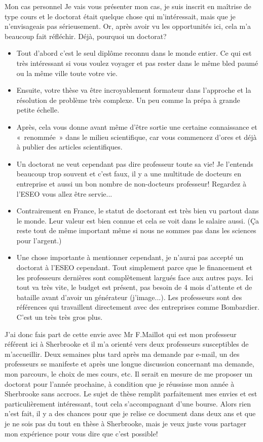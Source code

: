 \begin{example}{Mon cas personnel}
  Je vais vous présenter mon cas, je suis inscrit en maîtrise de type cours et le doctorat était quelque chose qui m’intéressait, mais que je n’envisageais pas sérieusement. Or, après avoir vu les opportunités ici, cela m’a beaucoup fait réfléchir.
  Déjà, pourquoi un doctorat?
  \begin{itemize}
    \item Tout d’abord c’est le seul diplôme reconnu dans le monde entier. Ce qui est très intéressant si vous voulez voyager et pas rester dans le même bled paumé ou la même ville toute votre vie.
    \item Ensuite, votre thèse va être incroyablement formateur dans l’approche et la résolution de problème très complexe. Un peu comme la prépa à grande petite échelle.
    \item Après, cela vous donne avant même d’être sortie une certaine connaissance et « renommée » dans le milieu scientifique, car vous commencez d’ores et déjà à publier des articles scientifiques.
    \item Un doctorat ne veut cependant pas dire professeur toute sa vie! Je l’entends beaucoup trop souvent et c’est faux, il y a une multitude de docteurs en entreprise et aussi un bon nombre de non-docteurs professeur! Regardez à l’ESEO vous allez être servie...
    \item Contrairement en France, le statut de doctorant est très bien vu partout dans le monde. Leur valeur est bien connue et cela se voit dans le salaire aussi. (Ça reste tout de même important même si nous ne sommes pas dans les sciences pour l’argent.)
    \item Une chose importante à mentionner cependant, je n’aurai pas accepté un doctorat à l’ESEO cependant. Tout simplement parce que le financement et les professeurs dernières sont complètement largués face aux autres pays. Ici tout va très vite, le budget est présent, pas besoin de 4 mois d’attente et de bataille avant d’avoir un générateur (j’image...). Les professeurs sont des références qui travaillent directement avec des entreprises comme Bombardier. C’est un très très gros plus.
  \end{itemize}

  J’ai donc fais part de cette envie avec Mr F.Maillot qui est mon professeur référent ici à Sherbrooke et il m’a orienté vers deux professeurs susceptibles de m’accueillir.
  Deux semaines plus tard après ma demande par e-mail, un des professeurs se manifeste et après une longue discussion concernant ma demande, mon parcours, le choix de mes cours, etc. Il serait en mesure de me proposer un doctorat pour l’année prochaine, à condition que je réussisse mon année à Sherbrooke sans accrocs. Le sujet de thèse remplit parfaitement mes envies et est particulièrement intéressant, tout cela s’accompagnant d’une bourse.
  Alors rien n’est fait, il y a des chances pour que je relise ce document dans deux ans et que je ne sois pas du tout en thèse à Sherbrooke, mais je veux juste vous partager mon expérience pour vous dire que c’est possible!
\end{example}

